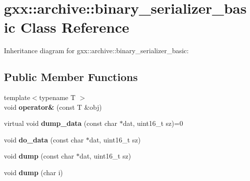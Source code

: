 \hypertarget{classgxx_1_1archive_1_1binary__serializer__basic}{}\section{gxx\+:\+:archive\+:\+:binary\+\_\+serializer\+\_\+basic Class Reference}
\label{classgxx_1_1archive_1_1binary__serializer__basic}


Inheritance diagram for gxx\+:\+:archive\+:\+:binary\+\_\+serializer\+\_\+basic\+:
\subsection*{Public Member Functions}
\begin{DoxyCompactItemize}
\item 
{\footnotesize template$<$typename T $>$ }\\void {\bfseries operator\&} (const T \&obj)\hypertarget{classgxx_1_1archive_1_1binary__serializer__basic_a738d83d711c6b75db269d1dab67c07fb}{}\label{classgxx_1_1archive_1_1binary__serializer__basic_a738d83d711c6b75db269d1dab67c07fb}

\item 
virtual void {\bfseries dump\+\_\+data} (const char $\ast$dat, uint16\+\_\+t sz)=0\hypertarget{classgxx_1_1archive_1_1binary__serializer__basic_a9a6ee8baa50e229dd7635452ce183b18}{}\label{classgxx_1_1archive_1_1binary__serializer__basic_a9a6ee8baa50e229dd7635452ce183b18}

\item 
void {\bfseries do\+\_\+data} (const char $\ast$dat, uint16\+\_\+t sz)\hypertarget{classgxx_1_1archive_1_1binary__serializer__basic_a30337c9dac545308bf37a6df5c56cda2}{}\label{classgxx_1_1archive_1_1binary__serializer__basic_a30337c9dac545308bf37a6df5c56cda2}

\item 
void {\bfseries dump} (const char $\ast$dat, uint16\+\_\+t sz)\hypertarget{classgxx_1_1archive_1_1binary__serializer__basic_aafbd976ea46283071a75b6c748d9c933}{}\label{classgxx_1_1archive_1_1binary__serializer__basic_aafbd976ea46283071a75b6c748d9c933}

\item 
void {\bfseries dump} (char i)\hypertarget{classgxx_1_1archive_1_1binary__serializer__basic_aac1b672e27662d6e950918919445e427}{}\label{classgxx_1_1archive_1_1binary__serializer__basic_aac1b672e27662d6e950918919445e427}


\end{DoxyCompactItemize}
